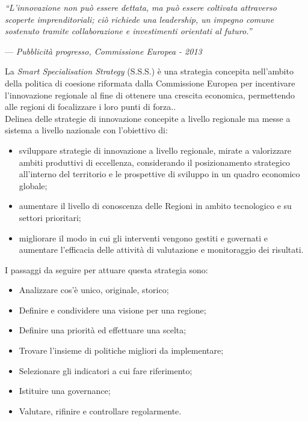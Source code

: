 \begin{flushright}{
	\slshape    
	``L'innovazione non può essere dettata, ma può essere coltivata attraverso scoperte imprenditoriali; ciò richiede una leadership, un impegno comune sostenuto tramite collaborazione e investimenti orientati al futuro.''} 
	
	\medskip
    --- \textit{Pubblicità progresso, Commissione Europea - 2013}
\end{flushright}


\noindent La \textit{Smart Specialisation Strategy} (S.S.S.) è una strategia concepita nell'ambito della politica di coesione riformata dalla Commissione Europea per incentivare l'innovazione regionale al fine di ottenere una crescita economica, permettendo alle regioni di focalizzare i loro punti di forza..\\
Delinea delle strategie di innovazione concepite a livello regionale ma messe a sistema a livello nazionale con l'obiettivo di:
\begin{itemize}
\item sviluppare strategie di innovazione a livello regionale, mirate a valorizzare ambiti produttivi di eccellenza, considerando il posizionamento strategico all'interno del territorio e le prospettive di sviluppo in un quadro economico globale;
\item aumentare il livello di conoscenza delle Regioni in ambito tecnologico e su settori prioritari;
\item migliorare il modo in cui gli interventi vengono gestiti e governati e aumentare l'efficacia delle attività di valutazione e monitoraggio dei risultati.
\end{itemize}
I passaggi da seguire per attuare questa strategia sono:
\begin{itemize}
\item Analizzare cos'è unico, originale, storico;
\item Definire e condividere una visione per una regione;
\item Definire una priorità ed effettuare una scelta;
\item Trovare l'insieme di politiche migliori da implementare;
\item Selezionare gli indicatori a cui fare riferimento;
\item Istituire una governance;
\item Valutare, rifinire e controllare regolarmente.
\end{itemize}

